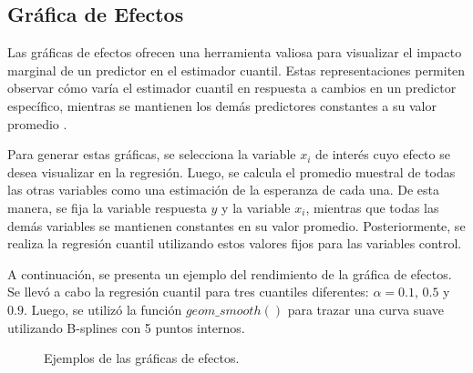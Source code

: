 \subsection{Gráfica de Efectos}

Las gráficas de efectos ofrecen una herramienta valiosa para visualizar el impacto marginal de un predictor en el estimador cuantil. Estas representaciones permiten observar cómo varía el estimador cuantil en respuesta a cambios en un predictor específico, mientras se mantienen los demás predictores constantes a su valor promedio \cite{Tepegjozova2022}.

Para generar estas gráficas, se selecciona la variable $x_i$ de interés cuyo efecto se desea visualizar en la regresión. Luego, se calcula el promedio muestral de todas las otras variables como una estimación de la esperanza de cada una. De esta manera, se fija la variable respuesta $y$ y la variable $x_i$, mientras que todas las demás variables se mantienen constantes en su valor promedio. Posteriormente, se realiza la regresión cuantil utilizando estos valores fijos para las variables control.

A continuación, se presenta un ejemplo del rendimiento de la gráfica de efectos. Se llevó a cabo la regresión cuantil para tres cuantiles diferentes: $\alpha = 0.1$, $0.5$ y $0.9$. Luego, se utilizó la función $geom\_smooth()$ para trazar una curva suave utilizando B-splines con 5 puntos internos. 

\begin{figure}[H]
 \centering
    \caption{Ejemplos de las gráficas de efectos.}
    \label{fig:Efectos}
\end{figure}

